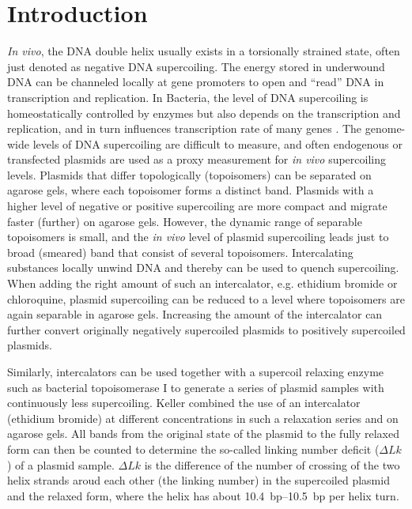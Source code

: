\documentclass[10pt,letterpaper]{article}
\begin{document}
\linenumbers


\section{Introduction}
\textit{In vivo}, the DNA double helix usually exists in a torsionally
strained state, often just denoted as negative DNA supercoiling.  The
energy stored in underwound DNA can be channeled locally at gene
promoters to open and ``read'' DNA in transcription and replication.
In Bacteria, the level of DNA supercoiling is homeostatically controlled by
enzymes but also depends on the transcription and replication, and
in turn influences transcription rate of many genes \cite{Dorman2019}. 
%
The genome-wide levels of DNA supercoiling are difficult to measure,
and often endogenous or transfected plasmids are used as a proxy
measurement for \textit{in vivo} supercoiling levels. Plasmids that
differ topologically (topoisomers) can be separated on agarose gels,
where each topoisomer forms a distinct band. Plasmids with a higher
level of negative or positive supercoiling are more compact and
migrate faster (further) on agarose gels. However, the dynamic range
of separable topoisomers is small, and the \textit{in vivo} level of
plasmid supercoiling leads just to broad (smeared) band that consist
of several topoisomers. Intercalating substances locally unwind DNA
and thereby can be used to quench supercoiling.  When adding the right
amount of such an intercalator, e.g. ethidium bromide or chloroquine,
plasmid supercoiling can be reduced to a level where topoisomers are
again separable in agarose gels. Increasing the amount of the intercalator
can further convert originally negatively supercoiled plasmids to
positively supercoiled plasmids.

Similarly, intercalators can be used together with a supercoil
relaxing enzyme such as bacterial topoisomerase I to generate a series
of plasmid samples with continuously less supercoiling. Keller
combined the use of an intercalator (ethidium bromide) at different
concentrations in such a relaxation series and on agarose gels. All
bands from the original state of the plasmid to the fully relaxed form
can then be counted to determine the so-called linking number deficit
($\Delta Lk$) of a plasmid sample. $\Delta Lk$ is the difference of the
number of crossing of the two helix strands aroud each other (the
linking number) in the supercoiled plasmid and the relaxed form, where
the helix has about \SIrange{10.4}{10.5}{bp} per helix turn.
\end{document}
